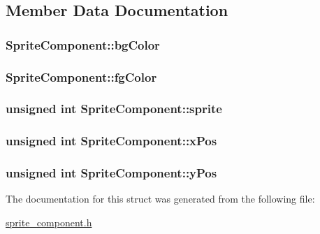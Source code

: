 \subsection{Member Data Documentation}
\hypertarget{structSpriteComponent_a7343c020be982393fee296ea7c08bc0c}{
\subsubsection[{bg\-Color}]{ Sprite\-Component\-::bg\-Color}}\label{structSpriteComponent_a7343c020be982393fee296ea7c08bc0c}
\hypertarget{structSpriteComponent_a057de96f1a2de2f38e98c5fcdbb9cedc}{
\subsubsection[{fg\-Color}]{ Sprite\-Component\-::fg\-Color}}\label{structSpriteComponent_a057de96f1a2de2f38e98c5fcdbb9cedc}
\hypertarget{structSpriteComponent_a27597e6299ef371db796928d6cdc54db}{
\subsubsection[{sprite}]{\setlength{\rightskip}{0pt plus 5cm}unsigned int Sprite\-Component\-::sprite}}\label{structSpriteComponent_a27597e6299ef371db796928d6cdc54db}
\hypertarget{structSpriteComponent_af3b4dbdac3f132358f2dd983ec487a9e}{
\subsubsection[{x\-Pos}]{\setlength{\rightskip}{0pt plus 5cm}unsigned int Sprite\-Component\-::x\-Pos}}\label{structSpriteComponent_af3b4dbdac3f132358f2dd983ec487a9e}
\hypertarget{structSpriteComponent_aabf6f09bdbf8531b41ceb6f9bc20a773}{
\subsubsection[{y\-Pos}]{\setlength{\rightskip}{0pt plus 5cm}unsigned int Sprite\-Component\-::y\-Pos}}\label{structSpriteComponent_aabf6f09bdbf8531b41ceb6f9bc20a773}


The documentation for this struct was generated from the following file\-:\begin{DoxyCompactItemize}
\item 
\hyperlink{sprite__component_8h}{sprite\-\_\-component.\-h}\end{DoxyCompactItemize}
